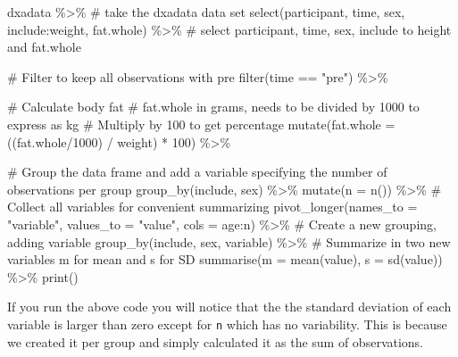 \documentclass[
  11pt,
  letterpaper,
]{scrbook}
\newenvironment{Shaded}{\begin{snugshade}}{\end{snugshade}}
\newcommand{\AttributeTok}[1]{\textcolor[rgb]{0.40,0.45,0.13}{#1}}
\newcommand{\CommentTok}[1]{\textcolor[rgb]{0.37,0.37,0.37}{#1}}
\newcommand{\DecValTok}[1]{\textcolor[rgb]{0.68,0.00,0.00}{#1}}
\newcommand{\FunctionTok}[1]{\textcolor[rgb]{0.28,0.35,0.67}{#1}}
\newcommand{\NormalTok}[1]{\textcolor[rgb]{0.00,0.23,0.31}{#1}}
\newcommand{\SpecialCharTok}[1]{\textcolor[rgb]{0.37,0.37,0.37}{#1}}
\newcommand{\StringTok}[1]{\textcolor[rgb]{0.13,0.47,0.30}{#1}}
\begin{document}
\begin{Shaded}
\begin{Highlighting}[numbers=left,,]
\NormalTok{dxadata }\SpecialCharTok{\%\textgreater{}\%} \CommentTok{\# take the dxadata data set}
  \FunctionTok{select}\NormalTok{(participant, time, sex, include}\SpecialCharTok{:}\NormalTok{weight, fat.whole) }\SpecialCharTok{\%\textgreater{}\%} 
  \CommentTok{\# select participant, time, sex, include to height and fat.whole}
  
  \CommentTok{\# Filter to keep all observations with pre}
  \FunctionTok{filter}\NormalTok{(time }\SpecialCharTok{==} \StringTok{"pre"}\NormalTok{) }\SpecialCharTok{\%\textgreater{}\%}
  
  \CommentTok{\# Calculate body fat}
  \CommentTok{\# fat.whole in grams, needs to be divided by 1000 to express as kg}
  \CommentTok{\# Multiply by 100 to get percentage}
  \FunctionTok{mutate}\NormalTok{(}\AttributeTok{fat.whole =}\NormalTok{ ((fat.whole}\SpecialCharTok{/}\DecValTok{1000}\NormalTok{) }\SpecialCharTok{/}\NormalTok{ weight) }\SpecialCharTok{*} \DecValTok{100}\NormalTok{) }\SpecialCharTok{\%\textgreater{}\%}
  
  \CommentTok{\# Group the data frame and add a variable specifying the number of observations per group}
  \FunctionTok{group\_by}\NormalTok{(include, sex) }\SpecialCharTok{\%\textgreater{}\%}
  \FunctionTok{mutate}\NormalTok{(}\AttributeTok{n =} \FunctionTok{n}\NormalTok{()) }\SpecialCharTok{\%\textgreater{}\%}
  \CommentTok{\# Collect all variables for convenient summarizing}
  \FunctionTok{pivot\_longer}\NormalTok{(}\AttributeTok{names\_to =} \StringTok{"variable"}\NormalTok{, }
               \AttributeTok{values\_to =} \StringTok{"value"}\NormalTok{, }
               \AttributeTok{cols =}\NormalTok{ age}\SpecialCharTok{:}\NormalTok{n) }\SpecialCharTok{\%\textgreater{}\%}
  \CommentTok{\# Create a new grouping, adding variable}
  \FunctionTok{group\_by}\NormalTok{(include, sex, variable) }\SpecialCharTok{\%\textgreater{}\%}
  \CommentTok{\# Summarize in two new variables m for mean and s for SD}
  \FunctionTok{summarise}\NormalTok{(}\AttributeTok{m =} \FunctionTok{mean}\NormalTok{(value), }
            \AttributeTok{s =} \FunctionTok{sd}\NormalTok{(value)) }\SpecialCharTok{\%\textgreater{}\%}
  \FunctionTok{print}\NormalTok{()}
\end{Highlighting}
\end{Shaded}

If you run the above code you will notice that the the standard
deviation of each variable is larger than zero except for \texttt{n}
which has no variability. This is because we created it per group and
simply calculated it as the sum of observations.
\end{document}
